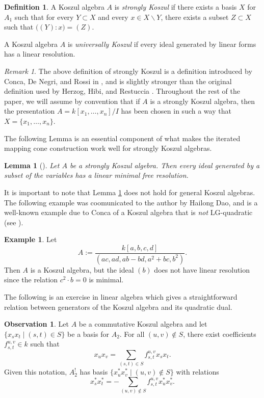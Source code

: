\documentclass[10pt]{amsart}
\newtheorem{lemma}[theorem]{Lemma}
\theoremstyle{definition}
\newtheorem{definition}[theorem]{Definition}
\newtheorem{example}[theorem]{Example}
\newtheorem{obs}[theorem]{Observation}
\theoremstyle{remark}
\newtheorem{remark}[theorem]{Remark}
\newtheorem{the context}[theorem]{The Context}
\numberwithin{equation}{theorem}
\numberwithin{equation}{section}
\begin{document}
\begin{definition}\label{def:strongKoszul}
A Koszul algebra $A$ is \emph{strongly Koszul} if there exists a basis $X$ for $A_1$ such that for every $Y \subset X$ and every $x \in X \backslash Y$, there exists a subset $Z \subset X$ such that $\big( (Y) : x \big) = (Z)$.

A Koszul algebra $A$ is \emph{universally Koszul} if every ideal generated by linear forms has a linear resolution.
\end{definition}

\begin{remark}
The above definition of strongly Koszul is a definition introduced by Conca, De Negri, and Rossi in \cite[Definition 3.11]{conca2013koszul}, and is slightly stronger than the original definition used by Herzog, Hibi, and Restuccia \cite{herzog2000strongly}. Throughout the rest of the paper, we will assume by convention that if $A$ is a strongly Koszul algebra, then the presentation $A = k[x_1 , \dots , x_n]/I$ has been chosen in such a way that $X = \{ x_1 , \dots , x_n \}$.
\end{remark}

The following Lemma is an essential component of what makes the iterated mapping cone construction work well for strongly Koszul algebras.
\begin{lemma}[\cite{herzog2000strongly}]\label{lem:linearVars}
Let $A$ be a strongly Koszul algebra. Then every ideal generated by a subset of the variables has a linear minimal free resolution.
\end{lemma}

It is important to note that Lemma \ref{lem:linearVars} does not hold for general Koszul algebras. The following example was coomunicated to the author by Hailong Dao, and is a well-known example due to Conca of a Koszul algebra that is \emph{not} LG-quadratic (see \cite[Example 1.20]{conca2014koszul}).

\begin{example}\label{ex:badKoszul}
Let
$$A := \frac{k[a,b,c,d]}{(ac,ad,ab-bd,a^2+bc,b^2)}.$$
Then $A$ is a Koszul algebra, but the ideal $(b)$ does not have linear resolution since the relation $c^2 \cdot b = 0$ is minimal.
\end{example}

The following is an exercise in linear algebra which gives a straightforward relation between generators of the Koszul algebra and its quadratic dual.

\begin{obs}\label{obs:A!relations}
Let $A$ be a commutative Koszul algebra and let $\{ x_s x_t \mid (s,t) \in S \}$ be a basis for $A_2$. For all $(u,v) \notin S$, there exist coefficients $f^{u,v}_{s,t} \in k$ such that
$$x_u x_v = \sum_{(s,t) \in S} f^{u,v}_{s,t} x_s x_t.$$
Given this notation, $A^!_2$ has basis $\{ x^*_u x^*_v \mid (u,v) \notin S \}$ with relations
$$x^*_s x^*_t = - \sum_{(u,v) \notin S} f^{u,v}_{s,t} x^*_u x^*_v.$$
\end{obs}
\end{document}
